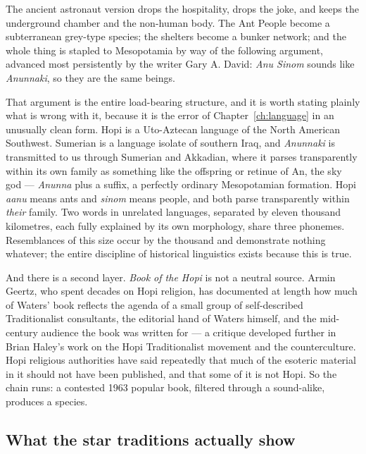 The ancient astronaut version drops the hospitality, drops the joke, and keeps the underground
chamber and the non-human body. The Ant People become a subterranean grey-type species; the
shelters become a bunker network; and the whole thing is stapled to Mesopotamia by way of the
following argument, advanced most persistently by the writer Gary A. David: \emph{Anu Sinom}
sounds like \emph{Anunnaki}, so they are the same beings.

That argument is the entire load-bearing structure, and it is worth stating plainly what is wrong
with it, because it is the error of Chapter~\ref{ch:language} in an unusually clean form. Hopi is
a Uto-Aztecan language of the North American Southwest. Sumerian is a language isolate of
southern Iraq, and \emph{Anunnaki} is transmitted to us through Sumerian and Akkadian, where it
parses transparently within its own family as something like the offspring or retinue of An, the
sky god --- \emph{Anunna} plus a suffix, a perfectly ordinary Mesopotamian formation. Hopi
\emph{aanu} means ants and \emph{sinom} means people, and both parse transparently within
\emph{their} family. Two words in unrelated languages, separated by eleven thousand kilometres,
each fully explained by its own morphology, share three phonemes.  Resemblances of this size occur by
the thousand and demonstrate nothing whatever; the entire discipline of historical linguistics
exists because this is true.

And there is a second layer. \emph{Book of the Hopi} is not a neutral source. Armin Geertz, who
spent decades on Hopi religion, has documented at length how much of Waters' book reflects the
agenda of a small group of self-described Traditionalist consultants, the editorial hand of
Waters himself, and the mid-century audience the book was written for --- a critique developed
further in Brian Haley's work on the Hopi Traditionalist movement and the counterculture. Hopi
religious authorities have said repeatedly that much of the esoteric material in it should not
have been published, and that some of it is not Hopi. So the chain runs: a contested 1963 popular
book, filtered through a sound-alike, produces a species. 

\subsection{What the star traditions actually show}

